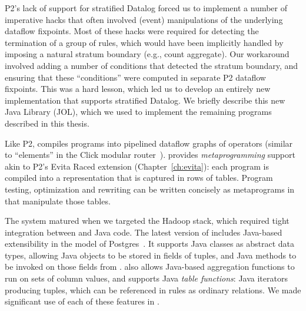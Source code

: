 P2's lack of support for stratified Datalog forced us to implement a number of
imperative hacks that often involved (event) manipulations of the underlying
dataflow fixpoints.  Most of these hacks were required for detecting the
termination of a group of rules, which would have been implicitly handled by
imposing a natural stratum boundary (e.g., count aggregate).  Our workaround
involved adding a number of conditions that detected the stratum boundary, and
ensuring that these ``conditions'' were computed in separate P2 dataflow
fixpoints.  This was a hard lesson, which led us to develop an entirely new
\OVERLOG implementation that supports stratified Datalog.  We briefly describe
this new Java \OVERLOG Library (JOL), which we used to implement the remaining
\OVERLOG programs described in this thesis.

Like P2, \JOL compiles \OVERLOG programs into pipelined dataflow graphs of
operators (similar to ``elements'' in the Click modular router~\cite{click}).
\JOL provides \emph{metaprogramming} support akin to P2's Evita Raced
extension (Chapter~\ref{ch:evita}): each \OVERLOG program is compiled into a
representation that is captured in rows of tables.  Program testing,
optimization and rewriting can be written concisely as metaprograms in \OVERLOG
that manipulate those tables.

The \JOL system matured when we targeted the Hadoop stack, which required tight
integration between \OVERLOG and Java code.  The latest version of \JOL
includes Java-based extensibility in the model of Postgres~\cite{postgres}.  It
supports Java classes as abstract data types, allowing Java objects to be
stored in fields of tuples, and Java methods to be invoked on those fields from
\OVERLOG.  \JOL also allows Java-based aggregation functions to run on sets of
column values, and supports Java \emph{table functions}: Java iterators
producing tuples, which can be referenced in \OVERLOG rules as ordinary
relations.  We made significant use of each of these features in \BOOMA.


